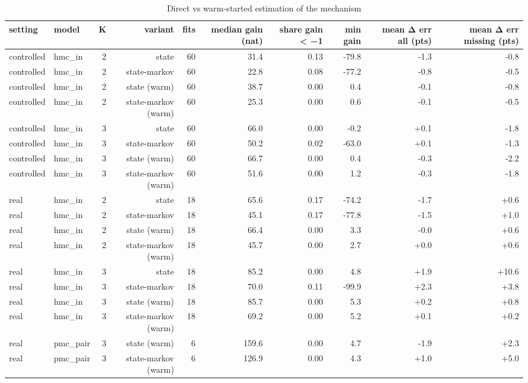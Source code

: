 \begin{table}[ht]
\centering
\small
\begin{tabular}{llrrrrrrrr}
\toprule
setting & model & K & variant & fits & median gain (nat) & share gain < −1 & min gain & mean Δ err all (pts) & mean Δ err missing (pts) \\
\midrule
controlled & hmc\_in & 2 & state & 60 & 31.4 & 0.13 & -79.8 & -1.3 & -0.8 \\
controlled & hmc\_in & 2 & state-markov & 60 & 22.8 & 0.08 & -77.2 & -0.8 & -0.5 \\
controlled & hmc\_in & 2 & state (warm) & 60 & 38.7 & 0.00 & 0.4 & -0.1 & -0.8 \\
controlled & hmc\_in & 2 & state-markov (warm) & 60 & 25.3 & 0.00 & 0.6 & -0.1 & -0.5 \\
controlled & hmc\_in & 3 & state & 60 & 66.0 & 0.00 & -0.2 & +0.1 & -1.8 \\
controlled & hmc\_in & 3 & state-markov & 60 & 50.2 & 0.02 & -63.0 & +0.1 & -1.3 \\
controlled & hmc\_in & 3 & state (warm) & 60 & 66.7 & 0.00 & 0.4 & -0.3 & -2.2 \\
controlled & hmc\_in & 3 & state-markov (warm) & 60 & 51.6 & 0.00 & 1.2 & -0.3 & -1.8 \\
real & hmc\_in & 2 & state & 18 & 65.6 & 0.17 & -74.2 & -1.7 & +0.6 \\
real & hmc\_in & 2 & state-markov & 18 & 45.1 & 0.17 & -77.8 & -1.5 & +1.0 \\
real & hmc\_in & 2 & state (warm) & 18 & 66.4 & 0.00 & 3.3 & -0.0 & +0.6 \\
real & hmc\_in & 2 & state-markov (warm) & 18 & 45.7 & 0.00 & 2.7 & +0.0 & +0.6 \\
real & hmc\_in & 3 & state & 18 & 85.2 & 0.00 & 4.8 & +1.9 & +10.6 \\
real & hmc\_in & 3 & state-markov & 18 & 70.0 & 0.11 & -99.9 & +2.3 & +3.8 \\
real & hmc\_in & 3 & state (warm) & 18 & 85.7 & 0.00 & 5.3 & +0.2 & +0.8 \\
real & hmc\_in & 3 & state-markov (warm) & 18 & 69.2 & 0.00 & 5.2 & +0.1 & +0.2 \\
real & pmc\_pair & 3 & state (warm) & 6 & 159.6 & 0.00 & 4.7 & -1.9 & +2.3 \\
real & pmc\_pair & 3 & state-markov (warm) & 6 & 126.9 & 0.00 & 4.3 & +1.0 & +5.0 \\
\bottomrule
\end{tabular}
\caption{Direct vs warm-started estimation of the mechanism}
\end{table}
